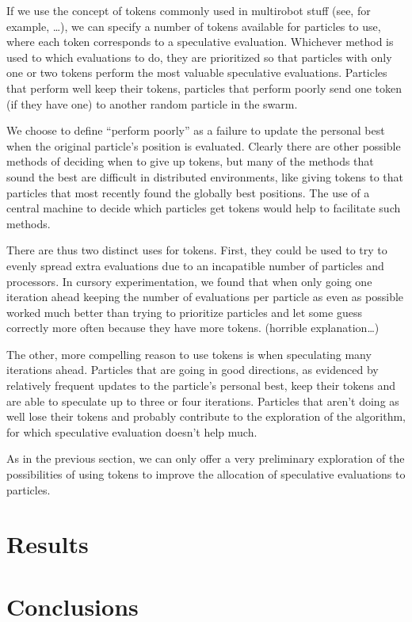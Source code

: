 \documentclass[journal,letterpaper]{IEEEtran}
\begin{document}
If we use the concept of tokens commonly used in multirobot stuff (see, for
example, \dots), we can specify a number of tokens available for particles to
use, where each token corresponds to a speculative evaluation.  Whichever
method is used to which evaluations to do, they are prioritized so that
particles with only one or two tokens perform the most valuable speculative
evaluations.  Particles that perform well keep their tokens, particles that
perform poorly send one token (if they have one) to another random particle in
the swarm.

We choose to define ``perform poorly'' as a failure to update the personal best
when the original particle's position is evaluated.  Clearly there are other
possible methods of deciding when to give up tokens, but many of the methods
that sound the best are difficult in distributed environments, like giving
tokens to that particles that most recently found the globally best positions.
The use of a central machine to decide which particles get tokens would help to
facilitate such methods.

There are thus two distinct uses for tokens.  First, they could be used to try
to evenly spread extra evaluations due to an incapatible number of particles
and processors.  In cursory experimentation, we found that when only going one
iteration ahead keeping the number of evaluations per particle as even as
possible worked much better than trying to prioritize particles and let some
guess correctly more often because they have more tokens. (horrible explanation\dots)

The other, more compelling reason to use tokens is when speculating many
iterations ahead.  Particles that are going in good directions, as evidenced by
relatively frequent updates to the particle's personal best, keep their tokens
and are able to speculate up to three or four iterations.  Particles that
aren't doing as well lose their tokens and probably contribute to the
exploration of the algorithm, for which speculative evaluation doesn't help
much.

As in the previous section, we can only offer a very preliminary exploration of
the possibilities of using tokens to improve the allocation of speculative
evaluations to particles.

\section{Results}
\label{sec:results}


\section{Conclusions}
\label{sec:conclusion}
\end{document}
